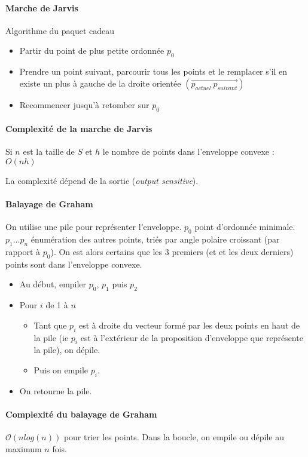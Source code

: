 \documentclass[french]{article}
\begin{document}
\paragraph{Marche de Jarvis} Algorithme du paquet cadeau
\begin{itemize}
	\item Partir du point de plus petite ordonnée $p_0$
	\item Prendre un point suivant, parcourir tous les points et le remplacer s'il en existe un plus à gauche de la droite orientée $(\vec{p_{actuel}~p_{suivant}})$
	\item Recommencer jusqu'à retomber sur $p_0$
\end{itemize}

\paragraph{Complexité de la marche de Jarvis} Si $n$ est la taille de $S$ et $h$ le nombre de points dans l'enveloppe convexe : $O(nh)$

La complexité dépend de la sortie (\emph{output sensitive}).


\paragraph{Balayage de Graham}
On utilise une pile pour représenter l'enveloppe.
$p_0$ point d'ordonnée minimale. $p_1\dots p_n$ énumération des autres points, triés par angle polaire croissant (par rapport à $p_0$).
On est alors certains que les 3 premiers (et et les deux derniers) points sont dans l'enveloppe convexe.

\begin{itemize}
\item Au début, empiler $p_0$, $p_1$ puis $p_2$
\item Pour $i$ de 1 à $n$\begin{itemize}
  \item Tant que $p_i$ est à droite du vecteur formé par les deux points en haut de la pile (ie $p_i$ est à l'extérieur de la proposition d'enveloppe que représente la pile), on dépile.
    \item Puis on empile $p_i$.
\end{itemize}
\item On retourne la pile.
\end{itemize}


\paragraph{Complexité du balayage de Graham}
$\mathcal{O}(n log(n))$ pour trier les points. Dans la boucle, on empile ou dépile au maximum $n$ fois.
\end{document}
